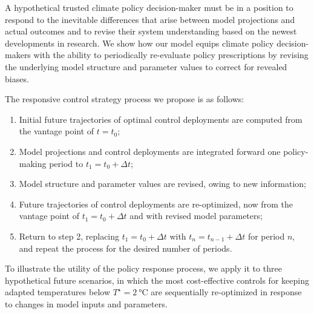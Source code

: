 \documentclass[9pt,twocolumn,twoside,lineno]{pnas-new}
\begin{document}
A hypothetical trusted climate policy decision-maker must be in a position to respond to the inevitable differences that arise between model projections and actual outcomes and to revise their system understanding based on the newest developments in research. We show how our model equips climate policy decision-makers with the ability to periodically re-evaluate policy prescriptions by revising the underlying model structure and parameter values to correct for revealed biases.

The responsive control strategy process we propose is as follows:
\begin{enumerate}
    \item Initial future trajectories of optimal control deployments are computed from the vantage point of $t=t_{0}$;
    \item Model projections and control deployments are integrated forward one policy-making period to $t_{1}=t_{0} + \Delta t$;
    \item Model structure and parameter values are revised, owing to new information;
    \item Future trajectories of control deployments are re-optimized, now from the vantage point of $t_{1}=t_{0}+\Delta t$ and with revised model parameters;
    \item Return to step 2, replacing $t_{1} = t_{0} + \Delta t$ with $t_{n} = t_{n-1}+\Delta t$ for period $n$, and repeat the process for the desired number of periods.
\end{enumerate}

To illustrate the utility of the policy response process, we apply it to three hypothetical future scenarios, in which the most cost-effective controls for keeping adapted temperatures below $T^{\star} = \SI{2}{\celsius}$ are sequentially re-optimized in response to changes in model inputs and parameters.
\end{document}
